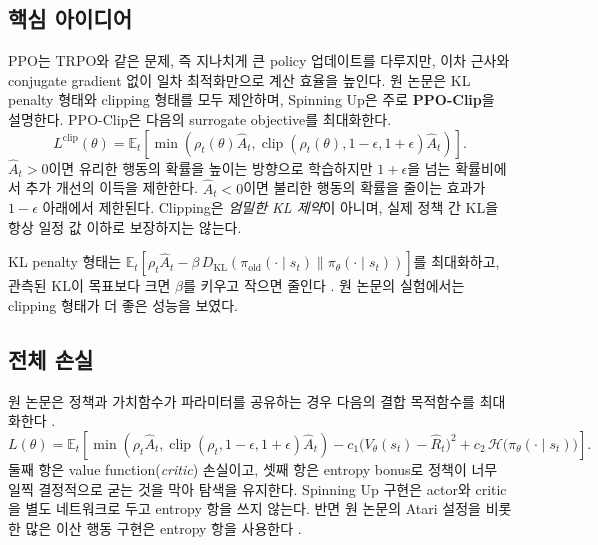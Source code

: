 \documentclass[11pt,a4paper]{article}
\newcommand{\E}{\mathbb{E}}
\newcommand{\KL}{D_{\mathrm{KL}}}
\newcommand{\clip}{\operatorname{clip}}
\begin{document}
\subsection{핵심 아이디어}
PPO는 TRPO와 같은 문제, 즉 지나치게 큰 policy 업데이트를 다루지만, 이차 근사와 conjugate gradient 없이 일차 최적화만으로 계산 효율을 높인다. 원 논문은 KL penalty 형태와 clipping 형태를 모두 제안하며, Spinning Up은 주로 \textbf{PPO-Clip}을 설명한다. PPO-Clip은 다음의 surrogate objective를 최대화한다.
\begin{equation}
 L^{\mathrm{clip}}(\theta)=\E_t\!\left[
 \min\left(\rho_t(\theta)\widehat A_t,
 \clip(\rho_t(\theta),1-\epsilon,1+\epsilon)\widehat A_t\right)
 \right].
\end{equation}
\(\widehat A_t>0\)이면 유리한 행동의 확률을 높이는 방향으로 학습하지만 \(1+\epsilon\)을 넘는 확률비에서 추가 개선의 이득을 제한한다. \(\widehat A_t<0\)이면 불리한 행동의 확률을 줄이는 효과가 \(1-\epsilon\) 아래에서 제한된다. Clipping은 \emph{엄밀한 KL 제약}이 아니며, 실제 정책 간 KL을 항상 일정 값 이하로 보장하지는 않는다.

KL penalty 형태는 \(\E_t[\rho_t\widehat A_t-\beta\,\KL(\pi_{\mathrm{old}}(\cdot\mid s_t)\|\pi_\theta(\cdot\mid s_t))]\)를 최대화하고, 관측된 KL이 목표보다 크면 \(\beta\)를 키우고 작으면 줄인다 \cite{ppo}. 원 논문의 실험에서는 clipping 형태가 더 좋은 성능을 보였다.

\subsection{전체 손실}
원 논문은 정책과 가치함수가 파라미터를 공유하는 경우 다음의 결합 목적함수를 최대화한다 \cite{ppo}.
\begin{equation}
 L(\theta)=\E_t\!\left[
 \min\left(\rho_t\widehat A_t,\clip(\rho_t,1-\epsilon,1+\epsilon)\widehat A_t\right)
 -c_1\bigl(V_\theta(s_t)-\widehat R_t\bigr)^2
 +c_2\,\mathcal H\bigl(\pi_\theta(\cdot\mid s_t)\bigr)\right].
\end{equation}
둘째 항은 value function(\emph{critic}) 손실이고, 셋째 항은 entropy bonus로 정책이 너무 일찍 결정적으로 굳는 것을 막아 탐색을 유지한다. Spinning Up 구현은 actor와 critic을 별도 네트워크로 두고 entropy 항을 쓰지 않는다. 반면 원 논문의 Atari 설정을 비롯한 많은 이산 행동 구현은 entropy 항을 사용한다 \cite{ppo,ppo-details}.
\end{document}
